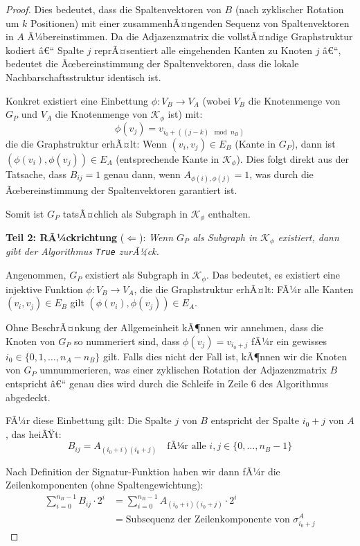 ﻿\documentclass[a4paper,12pt]{article}
\theoremstyle{definition}
\begin{document}
\begin{proof}
Dies bedeutet, dass die Spaltenvektoren von $B$ (nach zyklischer Rotation um $k$ Positionen) mit einer zusammenhÃ¤ngenden Sequenz von Spaltenvektoren in $A$ Ã¼bereinstimmen. Da die Adjazenzmatrix die vollstÃ¤ndige Graphstruktur kodiert â€“ Spalte $j$ reprÃ¤sentiert alle eingehenden Kanten zu Knoten $j$ â€“, bedeutet die Ãœbereinstimmung der Spaltenvektoren, dass die lokale Nachbarschaftsstruktur identisch ist.

Konkret existiert eine Einbettung $\phi: V_B \to V_A$ (wobei $V_B$ die Knotenmenge von $G_P$ und $V_A$ die Knotenmenge von $\mathcal{K}_{\phi}$ ist) mit:
\begin{equation}
\phi(v_j) = v_{i_0 + ((j-k) \mod n_B)}
\end{equation}
die die Graphstruktur erhÃ¤lt: Wenn $(v_i, v_j) \in E_B$ (Kante in $G_P$), dann ist $(\phi(v_i), \phi(v_j)) \in E_A$ (entsprechende Kante in $\mathcal{K}_{\phi}$). Dies folgt direkt aus der Tatsache, dass $B_{ij} = 1$ genau dann, wenn $A_{\phi(i), \phi(j)} = 1$, was durch die Ãœbereinstimmung der Spaltenvektoren garantiert ist.

Somit ist $G_P$ tatsÃ¤chlich als Subgraph in $\mathcal{K}_{\phi}$ enthalten.

\textbf{Teil 2: RÃ¼ckrichtung} ($\Leftarrow$): \textit{Wenn $G_P$ als Subgraph in $\mathcal{K}_{\phi}$ existiert, dann gibt der Algorithmus \texttt{True} zurÃ¼ck.}

Angenommen, $G_P$ existiert als Subgraph in $\mathcal{K}_{\phi}$. Das bedeutet, es existiert eine injektive Funktion $\phi: V_B \to V_A$, die die Graphstruktur erhÃ¤lt: FÃ¼r alle Kanten $(v_i, v_j) \in E_B$ gilt $(\phi(v_i), \phi(v_j)) \in E_A$.

Ohne BeschrÃ¤nkung der Allgemeinheit kÃ¶nnen wir annehmen, dass die Knoten von $G_P$ so nummeriert sind, dass $\phi(v_j) = v_{i_0 + j}$ fÃ¼r ein gewisses $i_0 \in \{0, 1, \ldots, n_A - n_B\}$ gilt. Falls dies nicht der Fall ist, kÃ¶nnen wir die Knoten von $G_P$ umnummerieren, was einer zyklischen Rotation der Adjazenzmatrix $B$ entspricht â€“ genau dies wird durch die Schleife in Zeile 6 des Algorithmus abgedeckt.

FÃ¼r diese Einbettung gilt: Die Spalte $j$ von $B$ entspricht der Spalte $i_0 + j$ von $A$, das heiÃŸt:
\begin{equation}
B_{ij} = A_{(i_0+i)(i_0+j)} \quad \text{fÃ¼r alle } i, j \in \{0, \ldots, n_B-1\}
\end{equation}

Nach Definition der Signatur-Funktion haben wir dann fÃ¼r die Zeilenkomponenten (ohne Spaltengewichtung):
\begin{align}
\sum_{i=0}^{n_B-1} B_{ij} \cdot 2^i &= \sum_{i=0}^{n_B-1} A_{(i_0+i)(i_0+j)} \cdot 2^i \\
&= \text{Subsequenz der Zeilenkomponente von } \sigma_{i_0+j}^A
\end{align}


\end{proof}
\end{document}
